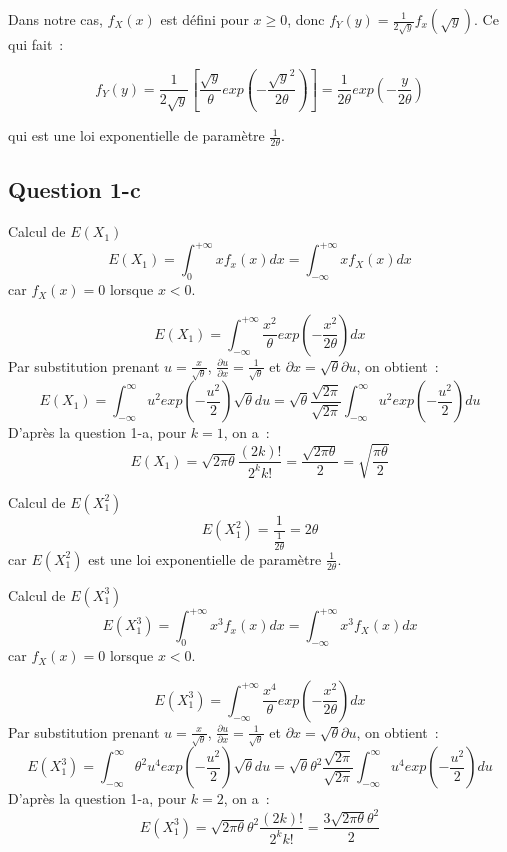 \documentclass[]{book}
\theoremstyle{definition}
\begin{document}
Dans notre cas, $f_{X}(x)$ est d\'efini pour $x \geq 0$, donc $f_{Y}(y)=\frac{1}{2\sqrt{y}}f_{x}(\sqrt{y})$. Ce qui fait~:

$$
f_{Y}(y) = \frac{1}{2\sqrt{y}} \left[ \frac{\sqrt{y}}{\theta}exp \left( -\frac{\sqrt{y}^2}{2\theta} \right) \right] = \frac{1}{2\theta} exp \left( -\frac{y}{2\theta} \right)
$$

qui est une loi exponentielle de param\`etre $\frac{1}{2\theta}$.

\subsection*{Question 1-c}
Calcul de $E(X_1)$
$$
E(X_1) = \int_{0}^{+\infty} x f_{x}(x) dx = \int_{-\infty}^{+\infty} x f_{X}(x) dx
$$
car $f_{X}(x) = 0$ lorsque $x < 0$.

$$
E(X_1) = \int_{-\infty}^{+\infty} \frac{x^2}{\theta} exp \left( -\frac{x^2}{2\theta}\right) dx
$$
Par substitution prenant $u = \frac{x}{\sqrt{\theta}}$, $\frac{\partial u}{\partial x} = \frac{1}{\sqrt{\theta}}$ et ${\partial x} = \sqrt{\theta}{\partial u}$, on obtient~:
$$
E(X_1) = \int_{-\infty}^{\infty} u^2 exp \left( -\frac{u^2}{2}\right) \sqrt{\theta} du = \sqrt{\theta} \frac{\sqrt{2\pi}}{\sqrt{2\pi}} \int_{-\infty}^{\infty} u^2 exp \left( -\frac{u^2}{2}\right)  du 
$$
D'apr\`es la question 1-a, pour $k=1$, on a~:
$$
E(X_1) = \sqrt{2\pi\theta}\frac{(2k)!}{2^k k!} = \frac{\sqrt{2\pi\theta}}{2} = \sqrt{\frac{\pi\theta}{2}}
$$

Calcul de $E(X_1^2)$
$$
E(X_1^2) = \frac{1}{\frac{1}{2\theta}} = {2\theta}
$$
car $E(X_1^2)$ est une loi exponentielle de param\`etre $\frac{1}{2\theta}$.


Calcul de $E(X_1^3)$
$$
E(X_1^3) = \int_{0}^{+\infty} x^3 f_{x}(x) dx = \int_{-\infty}^{+\infty} x^3 f_{X}(x) dx
$$
car $f_{X}(x) = 0$ lorsque $x < 0$.

$$
E(X_1^3) = \int_{-\infty}^{+\infty} \frac{x^4}{\theta} exp \left( -\frac{x^2}{2\theta}\right) dx
$$
Par substitution prenant $u = \frac{x}{\sqrt{\theta}}$, $\frac{\partial u}{\partial x} = \frac{1}{\sqrt{\theta}}$ et ${\partial x} = \sqrt{\theta}{\partial u}$, on obtient~:
$$
E(X_1^3) = \int_{-\infty}^{\infty} \theta^2 u^4 exp \left( -\frac{u^2}{2}\right) \sqrt{\theta} du = \sqrt{\theta}\theta^2 \frac{\sqrt{2\pi}}{\sqrt{2\pi}} \int_{-\infty}^{\infty} u^4 exp \left( -\frac{u^2}{2}\right)  du 
$$
D'apr\`es la question 1-a, pour $k=2$, on a~:
$$
E(X_1^3) = \sqrt{2\pi\theta}\theta^2\frac{(2k)!}{2^k k!} = \frac{3\sqrt{2\pi\theta}\theta^2}{2} 
$$
\end{document}

